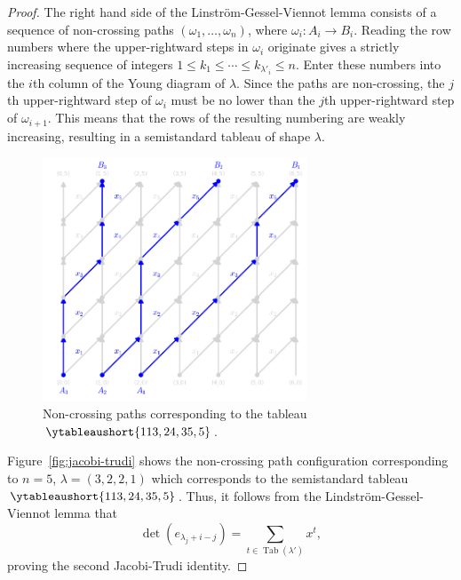 \documentclass[11pt]{amsart}
\theoremstyle{definition}
\theoremstyle{example}
\DeclareMathOperator{\tab}{Tab}
\begin{document}
\begin{proof}
  The right hand side of the Linstr\"om-Gessel-Viennot lemma consists of a sequence of non-crossing paths $(\omega_1,\dotsc,\omega_n)$, where $\omega_i:A_i\to B_i$.
  Reading the row numbers where the upper-rightward steps in $\omega_i$ originate gives a strictly increasing sequence of integers $1\leq k_1 \leq \dotsb \leq k_{\lambda'_i}\leq n$.
  Enter these numbers into the $i$th column of the Young diagram of $\lambda$.
  Since the paths are non-crossing, the $j$th upper-rightward step of $\omega_i$ must be no lower than the $j$th upper-rightward step of $\omega_{i+1}$.
  This means that the rows of the resulting numbering are weakly increasing, resulting in a semistandard tableau of shape $\lambda$.
  \begin{figure}
    \centering
    \includegraphics[width=0.7\textwidth]{jte.png}
    \caption{Non-crossing paths corresponding to the tableau \small{$\ytableaushort{113,24,35,5}$}.}
    \label{fig:jte}
  \end{figure}
  Figure~\ref{fig:jacobi-trudi} shows the non-crossing path configuration corresponding to $n=5$, $\lambda=(3,2,2,1)$ which corresponds to the semistandard tableau \small{$\ytableaushort{113,24,35,5}$}.
  Thus, it follows from the Lindstr\"om-Gessel-Viennot lemma that
  \begin{displaymath}
    \det(e_{\lambda_j+i-j}) = \sum_{t\in \tab(\lambda')} x^t,
  \end{displaymath}
  proving the second Jacobi-Trudi identity.
\end{proof}
\end{document}
